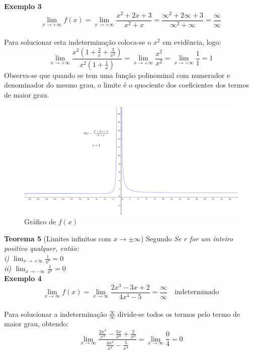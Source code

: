 \textbf{Exemplo 3}
$$
\lim_{x \to +\infty} f(x) = \lim_{x \to +\infty} \frac{x^2+2x+3}{x^2+x} = \frac{\infty^2+2\infty+3}{\infty^2+\infty}= \frac{\infty}{\infty}
$$\\
Para solucionar esta indeterminação coloca-se o $x^2$ em evidência, logo:
$$
\lim_{x \to +\infty} \frac{x^2(1+\frac{2}{x}+\frac{3}{x^2})}{x^2(1+\frac{1}{x})} = \lim_{x \to +\infty} \frac{x^2}{x^2}= \lim_{x \to +\infty} \frac{1}{1} = 1
$$
Observa-se que quando se tem uma função polinominal com numerador e denominador do mesmo grau, o limite é o quociente dos coeficientes dos termos de maior grau.\\
\begin{figure}[H]
\centering %
\includegraphics[width=15cm]{img/graph11.png} %
\caption{Gráfico de $f(x)$}
\label{fig:graph11}
\end{figure}

\textbf{Teorema 5}
(Limites infinitos com $x \to \pm \infty$) Segundo \textit{ Se $r$ for um inteiro positivo qualquer, então:\\
i) $\displaystyle \lim_{x \to + \infty} \frac{1}{x^r} = 0$\\
ii) $\displaystyle \lim_{x \to - \infty} \frac{1}{x^r} = 0$}\\


\textbf{Exemplo 4} $$\displaystyle \lim_{x \to \infty} f(x) = \lim_{x \to \infty} \frac{2x^3-3x+2}{4x^4-5} = \frac{\infty}{\infty} \quad \textrm{indeterminado}$$\\
Para solucionar a indeterminação $\displaystyle \frac{\infty}{\infty}$ divide-se todos os termos pelo termo de maior grau, obtendo:
$$
\lim_{x \to \infty} \frac{\frac{2x^3}{x^4} - \frac{3x}{x^4}+\frac{2}{x^4}}{\frac{4x^4}{x^4} - \frac{5}{x^4}} = \lim_{x \to \infty} \frac{0}{4} = 0
$$ 

